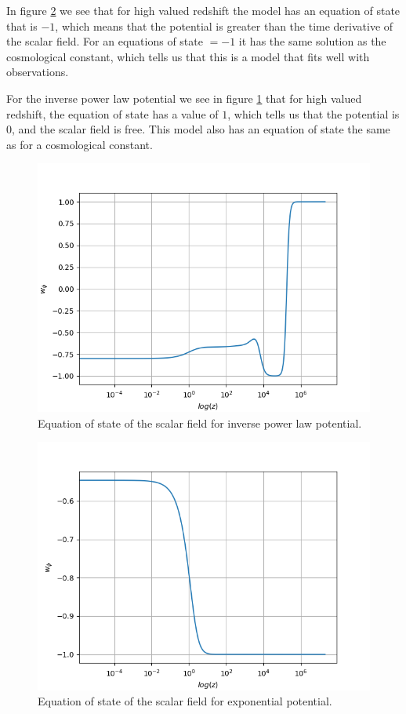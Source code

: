 \documentclass[a4paper,10pt]{article}
\begin{document}
In figure \ref{fig:eos_exp} we see that for high valued redshift the model has an equation of state that is $-1$, which means that the potential is greater than the time derivative of the scalar field. For an equations of state $= -1$ it has the same solution as the cosmological constant, which tells us that this is a model that fits well with observations.

For the inverse power law potential we see in figure \ref{fig:eos_ipl} that for high valued redshift, the equation of state has a value of $1$, which tells us that the potential is 0, and the scalar field is free. This model also has an equation of state the same as for a cosmological constant.

\begin{figure}[H]
\centering
\includegraphics[width=12cm]{eos_ipl.png}
\caption{Equation of state of the scalar field for inverse power law potential.}
\label{fig:eos_ipl}
\end{figure}
\begin{figure}[H]
\centering
\includegraphics[width=12cm]{eos_exp.png}
\caption{Equation of state of the scalar field for exponential potential.}
\label{fig:eos_exp}
\end{figure}
\end{document}
